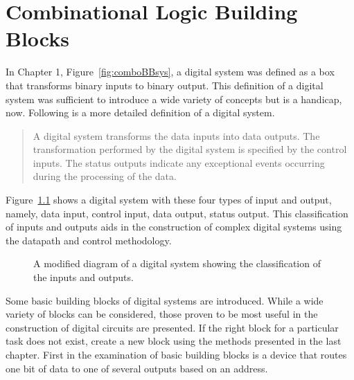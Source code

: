 \chapter{Combinational Logic Building Blocks}
\label{chapter:Combinational Building Blocks}
\graphicspath{ {./chapter04/Fig} }

In Chapter 1, Figure~\ref{fig:comboBBsys}, a digital system was defined 
as a box that transforms binary inputs to binary output.  This definition 
of a digital system was sufficient to introduce  a wide variety of 
concepts but is a handicap, now. Following is a more detailed 
definition of a digital system.
\begin{quote}  A digital system transforms the data inputs into 
data outputs.  The transformation performed by the digital system is 
specified by the control inputs.  The status outputs indicate any
exceptional events occurring during the processing of the data.
\end{quote}

Figure~\ref{fig:comboBBAsys} shows a digital system with these four types
of input and output, namely, data input, control input, data output, status output.
This classification of inputs and outputs aids in the
construction of complex digital systems using the datapath and
control methodology.

\begin{figure}[ht]
\caption{A modified diagram of a digital system showing the classification
of the inputs and outputs.}
\label{fig:comboBBAsys}
\end{figure}

Some basic building blocks of digital systems are introduced.  
While a wide variety of blocks can be considered, those
proven to be most useful in the construction 
of digital circuits are presented.  If the right block for a particular
task does not exist, create a new block using the methods presented 
in the last chapter.  First in the examination of basic building 
blocks is a device that routes one bit of data to one of several
outputs based on an address.

